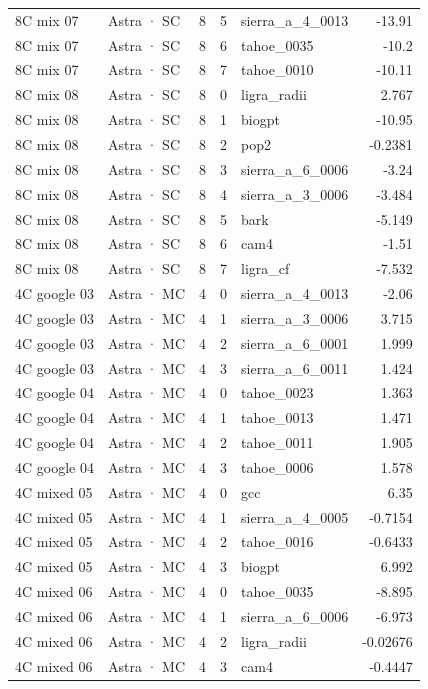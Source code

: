 \begin{tabular}{llrrlr}
8C mix 07 & Astra · SC & 8 & 5 & sierra\_a\_4\_0013 & -13.91 \\
8C mix 07 & Astra · SC & 8 & 6 & tahoe\_0035 & -10.2 \\
8C mix 07 & Astra · SC & 8 & 7 & tahoe\_0010 & -10.11 \\
8C mix 08 & Astra · SC & 8 & 0 & ligra\_radii & 2.767 \\
8C mix 08 & Astra · SC & 8 & 1 & biogpt & -10.95 \\
8C mix 08 & Astra · SC & 8 & 2 & pop2 & -0.2381 \\
8C mix 08 & Astra · SC & 8 & 3 & sierra\_a\_6\_0006 & -3.24 \\
8C mix 08 & Astra · SC & 8 & 4 & sierra\_a\_3\_0006 & -3.484 \\
8C mix 08 & Astra · SC & 8 & 5 & bark & -5.149 \\
8C mix 08 & Astra · SC & 8 & 6 & cam4 & -1.51 \\
8C mix 08 & Astra · SC & 8 & 7 & ligra\_cf & -7.532 \\
4C google 03 & Astra · MC & 4 & 0 & sierra\_a\_4\_0013 & -2.06 \\
4C google 03 & Astra · MC & 4 & 1 & sierra\_a\_3\_0006 & 3.715 \\
4C google 03 & Astra · MC & 4 & 2 & sierra\_a\_6\_0001 & 1.999 \\
4C google 03 & Astra · MC & 4 & 3 & sierra\_a\_6\_0011 & 1.424 \\
4C google 04 & Astra · MC & 4 & 0 & tahoe\_0023 & 1.363 \\
4C google 04 & Astra · MC & 4 & 1 & tahoe\_0013 & 1.471 \\
4C google 04 & Astra · MC & 4 & 2 & tahoe\_0011 & 1.905 \\
4C google 04 & Astra · MC & 4 & 3 & tahoe\_0006 & 1.578 \\
4C mixed 05 & Astra · MC & 4 & 0 & gcc & 6.35 \\
4C mixed 05 & Astra · MC & 4 & 1 & sierra\_a\_4\_0005 & -0.7154 \\
4C mixed 05 & Astra · MC & 4 & 2 & tahoe\_0016 & -0.6433 \\
4C mixed 05 & Astra · MC & 4 & 3 & biogpt & 6.992 \\
4C mixed 06 & Astra · MC & 4 & 0 & tahoe\_0035 & -8.895 \\
4C mixed 06 & Astra · MC & 4 & 1 & sierra\_a\_6\_0006 & -6.973 \\
4C mixed 06 & Astra · MC & 4 & 2 & ligra\_radii & -0.02676 \\
4C mixed 06 & Astra · MC & 4 & 3 & cam4 & -0.4447 \\

\end{tabular}
